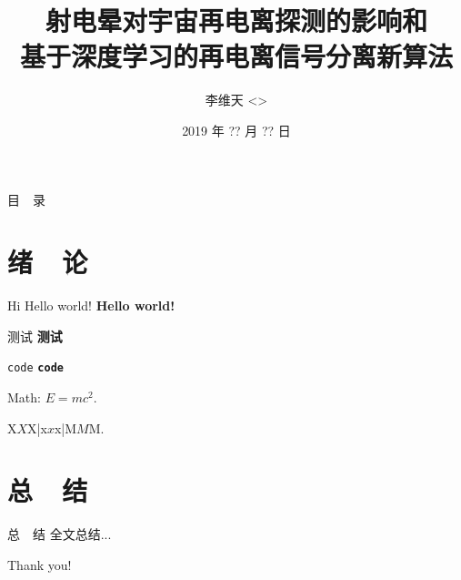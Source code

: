 \documentclass{beamer}
\title[探测宇宙再电离时期]{%
  射电晕对宇宙再电离探测的影响和\texorpdfstring{\\}{}%
  基于深度学习的再电离信号分离新算法%
}
\author[李维天]{李维天 <\email{liweitianux@sjtu.edu.cn}>}
\institute{%
  物理与天文学院\\%
  上海交通大学%
}
\date{2019 年 ?? 月 ?? 日}
\begin{document}
\maketitle

\begin{frame}{目~~录}
  \tableofcontents
\end{frame}

\section{绪~~论}

\begin{frame}{Hi}
Hello world! \textbf{Hello world!}

测试 \textbf{测试}

\texttt{code} \textbf{\texttt{code}}

Math:
$E = m c^2$.

X$X$X|x$x$x|M$M$M.

\end{frame}

\section{总~~结}

\begin{frame}{总~~结}
  全文总结...
\end{frame}

\begin{frame}[standout]
  Thank you!
\end{frame}
\end{document}
